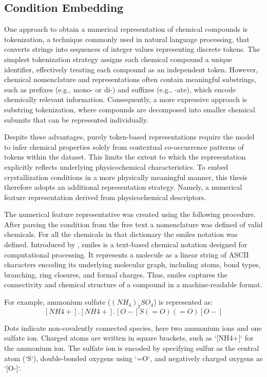 \subsection{Condition Embedding}\label{sec:methods/feature_engineering/condition_embedding}

One approach to obtain a numerical representation of chemical compounds is tokenization, a technique commonly used in natural language processing, that converts strings into sequences of integer values representing discrete tokens. The simplest tokenization strategy assigns each chemical compound a unique identifier, effectively treating each compound as an independent token. However, chemical nomenclature and representations often contain meaningful substrings, such as prefixes (e.g., mono- or di-) and suffixes (e.g., -ate), which encode chemically relevant information. Consequently, a more expressive approach is substring tokenization, where compounds are decomposed into smaller chemical subunits that can be represented individually.

Despite these advantages, purely token-based representations require the model to infer chemical properties solely from contextual co-occurrence patterns of tokens within the dataset. This limits the extent to which the representation explicitly reflects underlying physicochemical characteristics. To embed crystallization conditions in a more physically meaningful manner, this thesis therefore adopts an additional representation strategy. Namely, a numerical feature representation derived from physicochemical descriptors.

The numerical feature representative was created using the following procedure. After parsing the condition from the free text a nomenclature was defined of valid chemicals. For all the chemicals in that dictionary the \gls{smiles} notation was defined. 
Introduced by \cite{Weininger1988}, \gls{smiles} is a text-based chemical notation designed for computational processing. It represents a molecule as a linear string of ASCII characters encoding its underlying molecular graph, including atoms, bond types, branching, ring closures, and formal charges. Thus, \gls{smiles} captures the connectivity and chemical structure of a compound in a machine-readable format.

For example, ammonium sulfate ($(NH_4)_2SO_4$) is represented as: $$[NH4+].[NH4+].[O-]S(=O)(=O)[O-]$$

Dots indicate non-covalently connected species, here two ammonium ions and one sulfate ion. Charged atoms are written in square brackets, such as `[NH4+]` for the ammonium ion. The sulfate ion is encoded by specifying sulfur as the central atom (`S`), double-bonded oxygens using `=O`, and negatively charged oxygens as `[O-]`.

